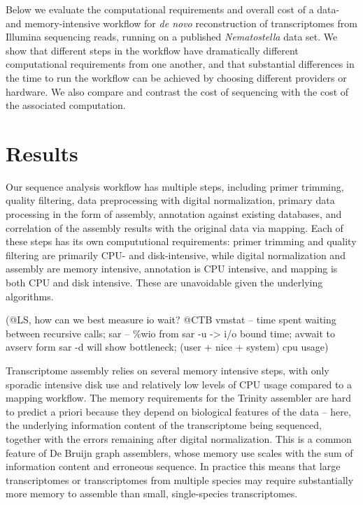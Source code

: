 \documentclass[11pt]{article}
\begin{document}
Below we evaluate the computational requirements and overall cost of a
data- and memory-intensive workflow for {\em de novo} reconstruction
of transcriptomes from Illumina sequencing reads, running on a
published {\em Nematostella} data set.  We show that different steps
in the workflow have dramatically different computational requirements
from one another, and that substantial differences in the time to run
the workflow can be achieved by choosing different providers or hardware.
We also compare and contrast the cost of sequencing with the cost of the
associated computation.


\section*{Results}

Our sequence analysis workflow has multiple steps, including primer
trimming, quality filtering, data preprocessing with digital
normalization, primary data processing in the form of assembly,
annotation against existing databases, and correlation of the assembly
results with the original data via mapping.  Each of these steps has
its own compututional requirements: primer trimming and quality
filtering are primarily CPU- and disk-intensive, while digital
normalization and assembly are memory intensive, annotation is CPU
intensive, and mapping is both CPU and disk intensive.  These are
unavoidable given the underlying algorithms.

(@LS, how can we best measure io wait?
@CTB vmstat -- time spent waiting between recursive calls; 
sar -- 	\%wio from sar -u -> i/o bound time;  
avwait to avserv form sar -d will show bottleneck;
 (user + nice + system) cpu usage)

Transcriptome assembly relies on several memory intensive steps, with
only sporadic intensive disk use and relatively low levels of CPU
usage compared to a mapping workflow.  The memory requirements for the
Trinity assembler are hard to predict a priori because they depend on
biological features of the data -- here, the underlying information
content of the transcriptome being sequenced, together with the errors
remaining after digital normalization.  This is a common feature of De
Bruijn graph assemblers, whose memory use scales with the sum of
information content and erroneous sequence.  In practice this means
that large transcriptomes or transcriptomes from multiple species may
require substantially more memory to assemble than small,
single-species transcriptomes.
\end{document}
